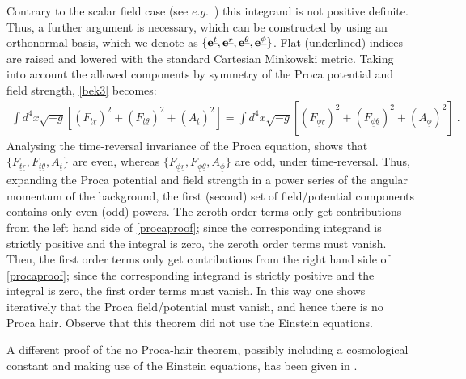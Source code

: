 Contrary to the scalar field case (see $e.g.$~\cite{Herdeiro:2015waa}) this integrand is not positive definite. Thus, a further argument is necessary, which can be constructed by using an orthonormal basis, which we denote as $\{ {\bf e}^{\underline{t}},{\bf e}^{\underline{r}},{\bf e}^{\underline{\theta}},{\bf e}^{\underline{\phi}}\}$. Flat (underlined) indices are raised and lowered with the standard Cartesian Minkowski metric. Taking into account the allowed components by symmetry of the Proca potential and field strength, \eqref{bek3} becomes:
\begin{equation}
\begin{array}{l}
\displaystyle{\int d^4x\sqrt{-g}\left[(F_{\underline{t}\underline{r}})^2+(F_{\underline{t}\underline{\theta}})^2+(A_{\underline{t}})^2\right]} \displaystyle{=\int d^4x\sqrt{-g}\left[(F_{\underline{\phi}\underline{r}})^2+(F_{\underline{\phi}\underline{\theta}})^2+(A_{\underline{\phi}})^2\right]} \ .
\end{array}
\label{procaproof}
\end{equation}
Analysing the time-reversal invariance of the Proca equation, shows that $\{F_{\underline{t}\underline{r}},F_{\underline{t}\underline{\theta}},A_{\underline{t}}\}$ are even, whereas $\{F_{\underline{\phi}\underline{r}},F_{\underline{\phi}\underline{\theta}},A_{\underline{\phi}}\}$ are odd, under time-reversal. Thus, expanding the Proca potential and field strength in a power series of the angular momentum of the background, the first (second) set of field/potential components contains only even (odd) powers. The zeroth order terms only get contributions from the left hand side of \eqref{procaproof}; since the corresponding integrand is strictly positive and the integral is zero, the zeroth order terms must vanish. Then, the first order terms only get contributions from the right hand side of \eqref{procaproof}; since the corresponding integrand is strictly positive and the integral is zero, the first order terms must vanish. In this way one shows iteratively that the Proca field/potential must vanish, and hence there is no Proca hair. 
Observe that this theorem did not use the Einstein equations.

A different proof of the no Proca-hair theorem, possibly including a cosmological constant  and making use of the Einstein equations, 
has been given in \cite{Bhattacharya:2011dq}.




